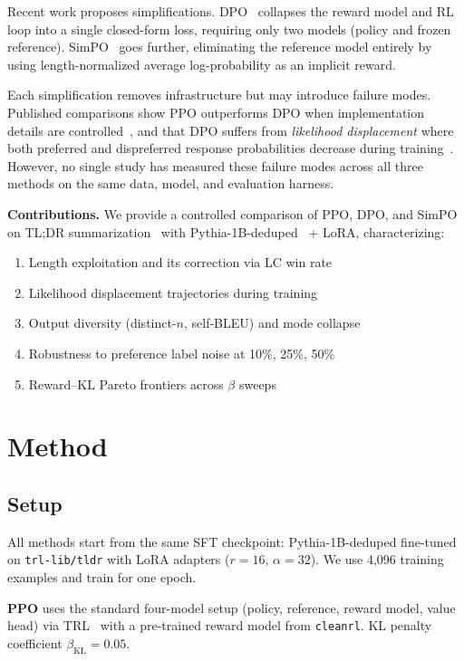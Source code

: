 \documentclass[10pt,twocolumn,letterpaper]{article}
\begin{document}
Recent work proposes simplifications. DPO~\cite{rafailov2023direct} collapses the reward model and RL loop into a single closed-form loss, requiring only two models (policy and frozen reference). SimPO~\cite{meng2024simpo} goes further, eliminating the reference model entirely by using length-normalized average log-probability as an implicit reward.

Each simplification removes infrastructure but may introduce failure modes. Published comparisons show PPO outperforms DPO when implementation details are controlled~\cite{xu2024dpo}, and that DPO suffers from \emph{likelihood displacement} where both preferred and dispreferred response probabilities decrease during training~\cite{razin2024unintentional}. However, no single study has measured these failure modes across all three methods on the same data, model, and evaluation harness.

\textbf{Contributions.} We provide a controlled comparison of PPO, DPO, and SimPO on TL;DR summarization~\cite{stiennon2020learning} with Pythia-1B-deduped~\cite{biderman2023pythia} + LoRA, characterizing:
\begin{enumerate}
    \item Length exploitation and its correction via LC win rate
    \item Likelihood displacement trajectories during training
    \item Output diversity (distinct-$n$, self-BLEU) and mode collapse
    \item Robustness to preference label noise at 10\%, 25\%, 50\%
    \item Reward--KL Pareto frontiers across $\beta$ sweeps
\end{enumerate}

\section{Method}

\subsection{Setup}

All methods start from the same SFT checkpoint: Pythia-1B-deduped fine-tuned on \texttt{trl-lib/tldr} with LoRA adapters ($r{=}16$, $\alpha{=}32$). We use 4,096 training examples and train for one epoch.

\textbf{PPO} uses the standard four-model setup (policy, reference, reward model, value head) via TRL~\cite{vonwerra2022trl} with a pre-trained reward model from \texttt{cleanrl}. KL penalty coefficient $\beta_{\text{KL}}{=}0.05$.
\end{document}

